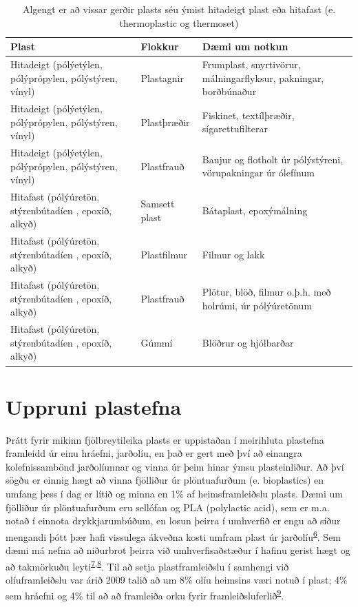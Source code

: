 \documentclass[icelandic,]{book}
\begin{document}
\begin{table}[t]

\caption{\label{tab:plast}Algengt er að vissar gerðir plasts séu ýmist hitadeigt plast eða hitafast (e. thermoplastic og thermoset)}
\centering
\begin{tabular}{lll}
\toprule
Plast & Flokkur & Dæmi um notkun\\
\midrule
Hitadeigt (pólýetýlen, pólýprópylen, pólýstýren, vínyl) & Plastagnir & Frumplast, snyrtivörur, málningarflyksur, pakningar, borðbúnaður\\
Hitadeigt (pólýetýlen, pólýprópylen, pólýstýren, vínyl) & Plastþræðir & Fiskinet, textílþræðir, sígarettufilterar\\
Hitadeigt (pólýetýlen, pólýprópylen, pólýstýren, vínyl) & Plastfrauð & Baujur og flotholt úr pólýstýreni, vörupakningar úr ólefínum\\
Hitafast (pólýúretön, stýrenbútadíen , epoxíð, alkyð) & Samsett plast & Bátaplast, epoxýmálning\\
Hitafast (pólýúretön, stýrenbútadíen , epoxíð, alkyð) & Plastfilmur & Filmur og lakk\\
\addlinespace
Hitafast (pólýúretön, stýrenbútadíen , epoxíð, alkyð) & Plastfrauð & Plötur, blöð, filmur o.þ.h. með holrúmi, úr pólýúretönum\\
Hitafast (pólýúretön, stýrenbútadíen , epoxíð, alkyð) & Gúmmí & Blöðrur og hjólbarðar\\
\bottomrule
\end{tabular}
\end{table}

\hypertarget{uppruni-plastefna}{%
\section*{Uppruni plastefna}\label{uppruni-plastefna}}

Þrátt fyrir mikinn fjölbreytileika plasts er uppistaðan í meirihluta plastefna framleidd úr einu hráefni, jarðolíu, en það er gert með því að einangra kolefnissambönd jarðolíunnar og vinna úr þeim hinar ýmsu plasteinliður. Að því sögðu er einnig hægt að vinna fjölliður úr plöntuafurðum (e. bioplastics) en umfang þess í dag er lítið og minna en 1\% af heimsframleiðslu plasts. Dæmi um fjölliður úr plöntuafurðum eru sellófan og PLA (polylactic acid), sem er m.a. notað í einnota drykkjarumbúðum, en losun þeirra í umhverfið er engu að síður mengandi þótt þær hafi vissulega ákveðna kosti umfram plast úr jarðolíu\textsuperscript{\protect\hyperlink{ref-karamanlioglu2017abiotic}{6}}. Sem dæmi má nefna að niðurbrot þeirra við umhverfisaðstæður í hafinu gerist hægt og að takmörkuðu leyti\textsuperscript{\protect\hyperlink{ref-tsuji2002environmental-1}{7},\protect\hyperlink{ref-tsuji2002environmental-2}{8}}. Til að setja plastframleiðslu í samhengi við olíuframleiðslu var árið 2009 talið að um 8\% olíu heimsins væri notuð í plast; 4\% sem hráefni og 4\% til að að framleiða orku fyrir framleiðsluferlið\textsuperscript{\protect\hyperlink{ref-hopewell2009plastics}{9}}.
\end{document}
